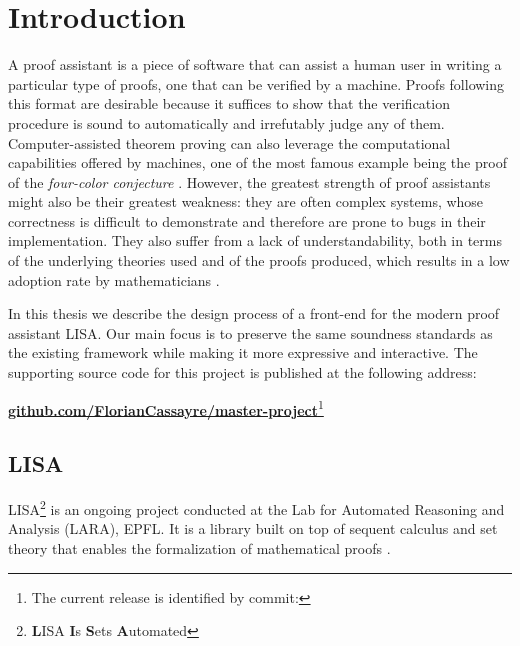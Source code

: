 \section{Introduction}
\label{sec:introduction}

A proof assistant is a piece of software that can assist a human user in writing a particular type of proofs, one that can be verified by a machine. Proofs following this format are desirable because it suffices to show that the verification procedure is sound to automatically and irrefutably judge any of them. Computer-assisted theorem proving can also leverage the computational capabilities offered by machines, one of the most famous example being the proof of the \textit{four-color conjecture} \cite{Appel1989}. However, the greatest strength of proof assistants might also be their greatest weakness: they are often complex systems, whose correctness is difficult to demonstrate and therefore are prone to bugs in their implementation. They also suffer from a lack of understandability, both in terms of the underlying theories used and of the proofs produced, which results in a low adoption rate by mathematicians \cite{Ayers2021}.

In this thesis we describe the design process of a front-end for the modern proof assistant LISA. Our main focus is to preserve the same soundness standards as the existing framework while making it more expressive and interactive. The supporting source code for this project is published at the following address:
\begin{center}
\href{http://github.com/FlorianCassayre/master-project}{\textbf{github.com/FlorianCassayre/master-project}}\footnote{The current release is identified by commit: }
\end{center}

\subsection{LISA}

LISA\footnote{\textbf{L}ISA \textbf{I}s \textbf{S}ets \textbf{A}utomated} is an ongoing project conducted at the Lab for Automated Reasoning and Analysis (LARA), EPFL. It is a library built on top of sequent calculus and set theory that enables the formalization of mathematical proofs \cite{Guilloud2022-2}.

